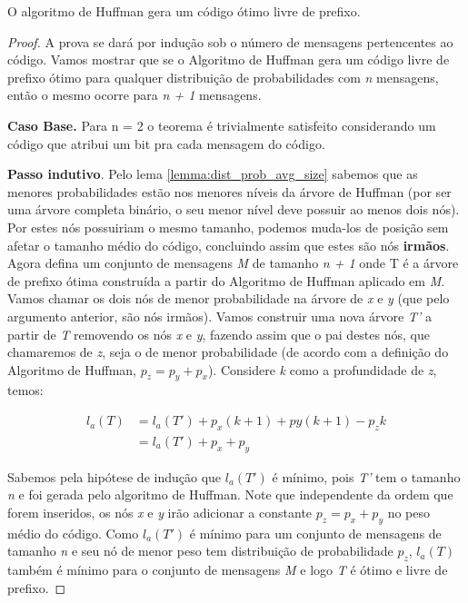 \begin{theorem} O algoritmo de Huffman gera um código ótimo livre de prefixo.
\begin{proof}
A prova se dará por indução sob o número de mensagens pertencentes ao código. Vamos mostrar que se o Algoritmo de Huffman gera um código livre de prefixo ótimo para qualquer distribuição de probabilidades com \emph{n} mensagens, então o mesmo ocorre para \emph{n + 1} mensagens.

\item \textbf{Caso Base.} Para n = 2 o teorema é trivialmente satisfeito considerando um código que atribui um bit pra cada mensagem do código.

\item \textbf{Passo indutivo}. Pelo lema \ref{lemma:dist_prob_avg_size} sabemos que as menores probabilidades estão nos menores níveis da árvore de Huffman (por ser uma árvore completa binário, o seu menor nível deve possuir ao menos dois nós). Por estes nós possuiriam o mesmo tamanho, podemos muda-los de posição sem afetar o tamanho médio do código, concluindo assim que estes são nós \textbf{irmãos}.\\
Agora defina um conjunto de mensagens \emph{M} de tamanho \emph{n + 1} onde T é a árvore de prefixo ótima construída a partir do Algoritmo de Huffman aplicado em \emph{M}. Vamos chamar os dois nós de menor probabilidade na árvore de \emph{x} e \emph{y} (que pelo argumento anterior, são nós irmãos). Vamos construir uma nova árvore \emph{T'} a partir de \emph{T} removendo os nós \emph{x} e \emph{y}, fazendo assim que o pai destes nós, que chamaremos de \emph{z}, seja o de menor probabilidade (de acordo com a definição do Algoritmo de Huffman, $p_z = p_y + p_x$). Considere \emph{k} como a profundidade de \emph{z}, temos:

\begin{align*}
l_a(T) &= l_a(T') + p_x(k + 1) + py(k + 1) - p_z k \\
&= l_a(T') + p_x + p_y
\end{align*}

Sabemos pela hipótese de indução que $l_a(T')$ é mínimo, pois \emph{T'} tem o tamanho \emph{n} e foi gerada pelo algoritmo de Huffman. Note que independente da ordem que forem inseridos, os nós \emph{x} e \emph{y} irão adicionar a constante $p_z = p_x + p_y$ no peso médio do código. Como $l_a(T')$ é mínimo para um conjunto de mensagens de tamanho \emph{n} e seu nó de menor peso tem distribuição de probabilidade $p_z$, $l_a(T)$ também é mínimo para o conjunto de mensagens \emph{M} e logo \emph{T} é ótimo e livre de prefixo. 
\end{proof}
\end{theorem}


